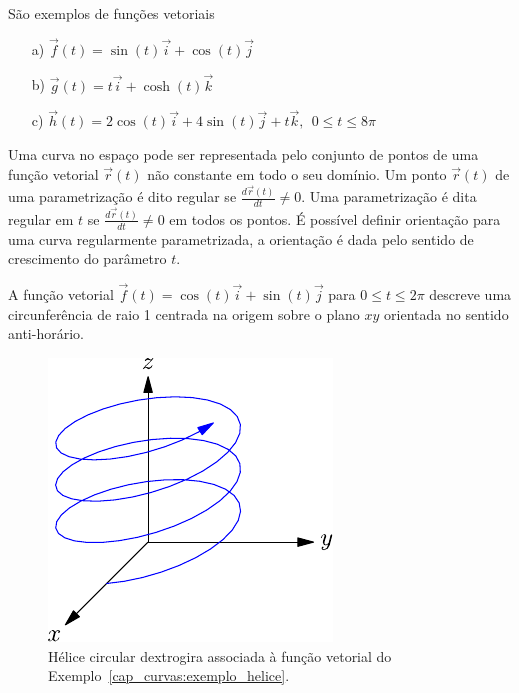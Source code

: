 \begin{ex}\label{exfv01} São exemplos de funções vetoriais
\begin{itemize}
\item [a)] $\vec{f}(t)=\sin(t)\vec{i}+\cos(t)\vec{j}$
\item [b)] $\vec{g}(t)=t \vec{i}+\cosh(t)\vec{k}$
\item [c)] $\vec{h}(t)=2\cos(t)\vec{i}+4\sin(t)\vec{j}+t\vec{k},~~ 0\leq t \leq 8\pi$
\end{itemize}
\end{ex}  

Uma curva no espaço pode ser representada pelo conjunto de pontos de uma função vetorial $\vec{r}(t)$ não constante em todo o seu domínio. Um ponto $\vec{r}(t)$ de uma parametrização é dito regular se $\frac{d\vec{r}(t)}{dt} \neq 0$. Uma parametrização é dita regular em $t$ se $\frac{d\vec{r}(t)}{dt} \neq 0$ em todos os pontos. É possível definir orientação para uma curva regularmente parametrizada, a orientação é dada pelo sentido de crescimento do parâmetro $t$. 

\begin{ex}
A função vetorial $\vec{f}(t)=\cos(t)\vec{i}+\sin(t)\vec{j}$ para $0\leq t \leq 2\pi$ descreve  uma circunferência de raio 1 centrada na origem sobre o plano $xy$ orientada no sentido anti-horário.
\end{ex}

\begin{figure}%
\begin{center}
    \includegraphics{./cap_curvas/figs/helice}
\caption{\label{helicedex}Hélice circular dextrogira associada à função vetorial do Exemplo~\ref{cap_curvas:exemplo_helice}.}
  \end{center}
\end{figure}

